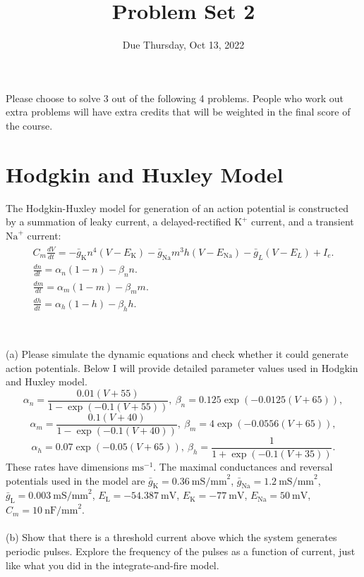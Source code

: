 \documentclass{article}
\title{Problem Set 2}
\date{Due Thursday, Oct 13, 2022}
\begin{document}
\maketitle
Please choose to solve 3 out of the following 4 problems. People who work out extra problems will have extra credits that will be weighted in the final score of the course. 

\section*{Hodgkin and Huxley Model}

The Hodgkin-Huxley model for generation of an action potential is constructed by a summation of leaky current, a delayed-rectified $\textrm{K}^{+}$ current, and a transient $\textrm{Na}^{+}$ current:
\begin{eqnarray}
\begin{aligned}
C_{m}\frac{dV}{dt}=-\bar{g}_{\textrm{K}}n^{4}(V-E_{\textrm{K}})-\bar{g}_{\textrm{Na}}m^{3}h(V-E_{\textrm{Na}})-\bar{g}_L(V-E_L)+I_{e}.  \\  
\frac{dn}{dt}=\alpha_n (1-n) - \beta_n n. \\
\frac{dm}{dt}=\alpha_m(1-m) - \beta_m m. \\
\frac{dh}{dt}=\alpha_h(1-h) - \beta_h h. \\
\end{aligned}
\end{eqnarray}
\\
\\
(a) Please simulate the dynamic equations and check whether it could generate action potentials. Below I will provide detailed parameter values used in Hodgkin and Huxley model. 
\[\alpha_n=\frac{0.01(V+55)}{1-\exp(-0.1(V+55))}, \ \beta_n=0.125\exp(-0.0125(V+65)),\]
\[\alpha_m=\frac{0.1(V+40)}{1-\exp(-0.1(V+40))},\ \beta_m=4\exp(-0.0556(V+65)),\]
\[\alpha_h=0.07\exp(-0.05(V+65)), \ \beta_h=\frac{1}{1+\exp(-0.1(V+35))}. \]
These rates have dimensions $\textrm{ms}^{-1}$. The maximal conductances and reversal potentials used in the model are $\bar{g}_{\textrm{K}} = 0.36\  \textrm{mS/mm}^2$, $\bar{g}_{\textrm{Na}} = 1.2\  \textrm{mS/mm}^2$,   $\bar{g}_{\textrm{L}} = 0.003\  \textrm{mS/mm}^2$, $E_\textrm{L} = -54.387\  \textrm{mV}$, $E_\textrm{K} = -77\  \textrm{mV}$, $E_\textrm{Na} = 50\  \textrm{mV}$, $C_m = 10\ \textrm{nF/mm}^2$.
\\
\\
(b) Show that there is a threshold current above which the system generates periodic pulses. Explore the frequency of the pulses as a function of current, just like what you did in the integrate-and-fire model.
\end{document}
